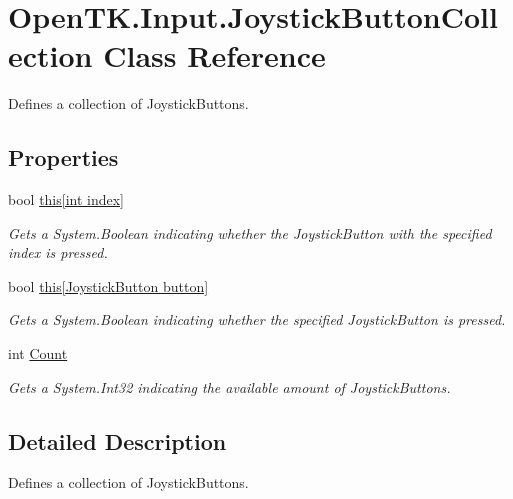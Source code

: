 \hypertarget{class_open_t_k_1_1_input_1_1_joystick_button_collection}{\section{Open\-T\-K.\-Input.\-Joystick\-Button\-Collection Class Reference}
\label{class_open_t_k_1_1_input_1_1_joystick_button_collection}
}


Defines a collection of Joystick\-Buttons.  


\subsection*{Properties}
\begin{DoxyCompactItemize}
\item 
bool \hyperlink{class_open_t_k_1_1_input_1_1_joystick_button_collection_a19f902624461596a5bbb4b976b9d8f61}{this\mbox{[}int index\mbox{]}}
\begin{DoxyCompactList}\small\item\em Gets a System.\-Boolean indicating whether the Joystick\-Button with the specified index is pressed. \end{DoxyCompactList}\item 
bool \hyperlink{class_open_t_k_1_1_input_1_1_joystick_button_collection_affc23bad0bf45d348f621d77fc7340c0}{this\mbox{[}\-Joystick\-Button button\mbox{]}}
\begin{DoxyCompactList}\small\item\em Gets a System.\-Boolean indicating whether the specified Joystick\-Button is pressed. \end{DoxyCompactList}\item 
int \hyperlink{class_open_t_k_1_1_input_1_1_joystick_button_collection_a8641b79aefe0a1f1ec035bb123db0bec}{Count}
\begin{DoxyCompactList}\small\item\em Gets a System.\-Int32 indicating the available amount of Joystick\-Buttons. \end{DoxyCompactList}\end{DoxyCompactItemize}


\subsection{Detailed Description}
Defines a collection of Joystick\-Buttons. 



